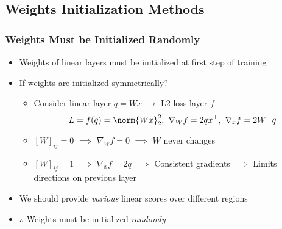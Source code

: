 \begin{figures}
\end{figures}

\subsection{Weights Initialization Methods}

\subsubsection*{Weights Must be Initialized Randomly}
\begin{itemize}
    \item Weights of linear layers must be initialized at first step of training
    \item If weights are initialized symmetrically?
    \begin{itemize}
        \item Consider linear layer $q=Wx$ $\to$ L2 loss layer $f$
        \begin{equation}
            L=f(q)=\norm{Wx}_2^2,~\nabla_Wf=2qx^{\top},~\nabla_xf=2W^{\top}q
        \end{equation}
        \item $[W]_{ij}=0$ $\implies$ $\nabla_Wf=0$ $\implies$ $W$ never changes
        \item $[W]_{ij}=1$ $\implies$ $\nabla_xf=2q$ $\implies$ Consistent gradients $\implies$ Limits directions on previous layer
    \end{itemize}
    \item We should provide \textit{various} linear scores over different regions
    \item $\therefore$ Weights must be initialized \textit{randomly}
\end{itemize}

